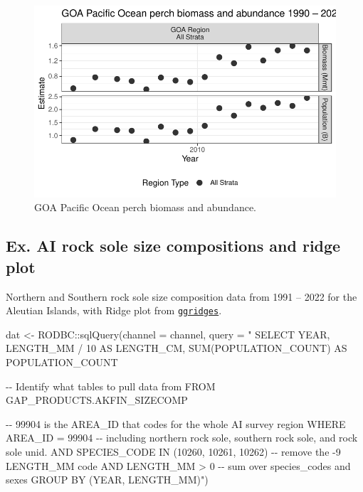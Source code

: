 \documentclass[
  letterpaper,
  oneside,
  open=any]{scrbook}
\newenvironment{Shaded}{\begin{snugshade}}{\end{snugshade}}
\newcommand{\AttributeTok}[1]{\textcolor[rgb]{0.40,0.45,0.13}{#1}}
\newcommand{\FunctionTok}[1]{\textcolor[rgb]{0.28,0.35,0.67}{#1}}
\newcommand{\NormalTok}[1]{\textcolor[rgb]{0.00,0.23,0.31}{#1}}
\newcommand{\OtherTok}[1]{\textcolor[rgb]{0.00,0.23,0.31}{#1}}
\newcommand{\SpecialCharTok}[1]{\textcolor[rgb]{0.37,0.37,0.37}{#1}}
\newcommand{\StringTok}[1]{\textcolor[rgb]{0.13,0.47,0.30}{#1}}
\begin{document}
\begin{figure}[H]

{\centering \includegraphics{content/akfin-oracle-sql-r_files/figure-pdf/test-1-plot-1.pdf}

}

\caption{GOA Pacific Ocean perch biomass and abundance.}

\end{figure}

\hypertarget{ex.-ai-rock-sole-size-compositions-and-ridge-plot}{%
\subsection{Ex. AI rock sole size compositions and ridge
plot}\label{ex.-ai-rock-sole-size-compositions-and-ridge-plot}}

Northern and Southern rock sole size composition data from 1991 -- 2022
for the Aleutian Islands, with Ridge plot from
\href{https://cran.r-project.org/web/packages/ggridges/vignettes/introduction.html}{\texttt{ggridges}}.

\begin{Shaded}
\begin{Highlighting}[]
\NormalTok{dat }\OtherTok{\textless{}{-}}\NormalTok{ RODBC}\SpecialCharTok{::}\FunctionTok{sqlQuery}\NormalTok{(}\AttributeTok{channel =}\NormalTok{ channel, }
                       \AttributeTok{query =} \StringTok{"}
\StringTok{SELECT }
\StringTok{YEAR,}
\StringTok{LENGTH\_MM / 10 AS LENGTH\_CM, }
\StringTok{SUM(POPULATION\_COUNT) AS POPULATION\_COUNT}

\StringTok{{-}{-} Identify what tables to pull data from}
\StringTok{FROM GAP\_PRODUCTS.AKFIN\_SIZECOMP }

\StringTok{{-}{-} 99904 is the AREA\_ID that codes for the whole AI survey region}
\StringTok{WHERE AREA\_ID = 99904}
\StringTok{{-}{-} including northern rock sole, southern rock sole, and rock sole unid.}
\StringTok{AND SPECIES\_CODE IN (10260, 10261, 10262)}
\StringTok{{-}{-} remove the {-}9 LENGTH\_MM code}
\StringTok{AND LENGTH\_MM \textgreater{} 0}
\StringTok{{-}{-} sum over species\_codes and sexes}
\StringTok{GROUP BY (YEAR, LENGTH\_MM)"}\NormalTok{)}
\end{Highlighting}
\end{Shaded}
\end{document}
